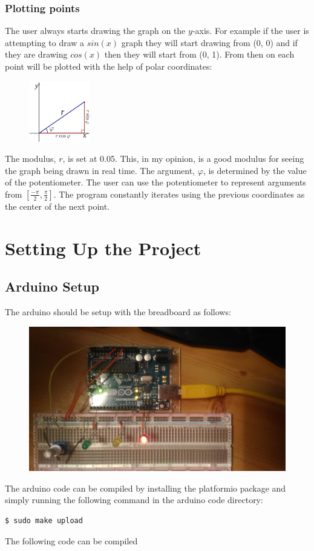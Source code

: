 \documentclass{article}
\begin{document}
\subsubsection{Plotting points}
The user always starts drawing the graph on the $y$-axis. For example if the
user is attempting to draw a $sin(x)$ graph they will start drawing from (0, 0)
and if they are drawing $cos(x)$ then they will start from (0, 1). From then on
each point will be plotted with the help of polar coordinates:
\begin{figure}[H]
\includegraphics[height=100px]{polar}
\centering
\end{figure}
The modulus, $r$, is set at 0.05. This, in my opinion, is a good modulus for
seeing the graph being drawn in real time. The argument, $\varphi$, is determined
by the value of the potentiometer. The user can use the potentiometer to represent
arguments from $[\frac{-\pi}{2}, \frac{\pi}{2}]$. The program constantly iterates
using the previous coordinates as the center of the next point.
\section{Setting Up the Project}
\subsection{Arduino Setup}
The arduino should be setup with the breadboard as follows:
\begin{figure}[H]
\includegraphics[width=\linewidth]{breadboard}
\end{figure}
The arduino code can be compiled by installing the platformio package and simply running the following command in the arduino code directory:
\begin{lstlisting}[language=bash]
$ sudo make upload
\end{lstlisting}
The following code can be compiled
\end{document}
